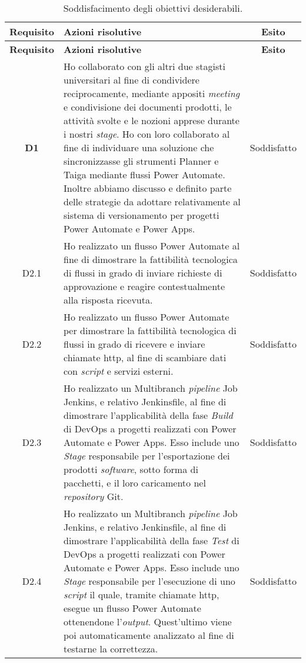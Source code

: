 \begin{longtable}{|c|p{8cm}|c|}
    \caption{Soddisfacimento degli obiettivi desiderabili.}
    \label{tab:soddObbDesiderabili}\\
    \hline \textbf{Requisito} & \textbf{Azioni risolutive} & \textbf{Esito}\\ \endfirsthead
    \hline \textbf{Requisito} & \textbf{Azioni risolutive} & \textbf{Esito}\\ \endhead
    \hline \endfoot
    \hline \endlastfoot
    \hline \textbf{D1}  & Ho collaborato con gli altri due stagisti universitari al fine di condividere reciprocamente, mediante appositi \emph{meeting} e condivisione dei documenti prodotti, le attività svolte e le nozioni apprese durante i nostri \emph{stage}. Ho con loro collaborato al fine di individuare una soluzione che sincronizzasse gli strumenti Planner e Taiga mediante flussi Power Automate. Inoltre abbiamo discusso e definito parte delle strategie da adottare relativamente al sistema di versionamento per progetti Power Automate e Power Apps. & Soddisfatto\\
    \hline D2.1  & Ho realizzato un flusso Power Automate al fine di dimostrare la fattibilità tecnologica di flussi in grado di inviare richieste di approvazione e reagire contestualmente alla risposta ricevuta. & Soddisfatto\\
    \hline D2.2  & Ho realizzato un flusso Power Automate per dimostrare la fattibilità tecnologica di flussi in grado di ricevere e inviare chiamate \gls{http}, al fine di scambiare dati con \emph{script} e servizi esterni. & Soddisfatto\\
    \hline D2.3  & Ho realizzato un Multibranch \emph{pipeline} Job Jenkins, e relativo Jenkinsfile, al fine di dimostrare l'applicabilità della fase \emph{Build} di \gls{DevOps} a progetti realizzati con Power Automate e Power Apps. Esso include uno \emph{Stage} responsabile per l'esportazione dei prodotti \emph{software}, sotto forma di pacchetti, e il loro caricamento nel \emph{repository} Git. & Soddisfatto\\
    \hline D2.4  & Ho realizzato un Multibranch \emph{pipeline} Job Jenkins, e relativo Jenkinsfile, al fine di dimostrare l'applicabilità della fase \emph{Test} di \gls{DevOps} a progetti realizzati con Power Automate e Power Apps. Esso include uno \emph{Stage} responsabile per l'esecuzione di uno \emph{script} il quale, tramite chiamate \gls{http}, esegue un flusso Power Automate ottenendone l'\emph{output}. Quest'ultimo viene poi automaticamente analizzato al fine di testarne la correttezza. & Soddisfatto\\

\end{longtable}

